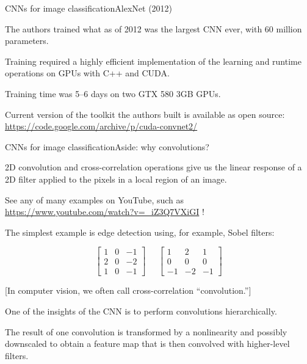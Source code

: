 \documentclass{beamer}
\begin{document}
\begin{frame}{CNNs for image classification}{AlexNet (2012)}

  The authors trained what as of 2012 was the largest CNN ever, with
  60 million parameters.

  \medskip

  Training required a highly efficient implementation of the learning
  and runtime operations on GPUs with C++ and CUDA.

  \medskip

  Training time was 5--6 days on two GTX 580 3GB GPUs.
  
  \medskip

  Current version of the toolkit the authors built is available as
  open source: \url{https://code.google.com/archive/p/cuda-convnet2/}
  
\end{frame}


\begin{frame}{CNNs for image classification}{Aside: why convolutions?}

  2D convolution and cross-correlation operations give us the linear
  response of a 2D filter applied to the pixels in a local region of
  an image.

  \medskip

  See any of many examples on YouTube, such as
  \url{https://www.youtube.com/watch?v=_iZ3Q7VXiGI} !

  \medskip

  The simplest example is edge detection using, for example, Sobel
  filters:

  $$\begin{bmatrix} 1 & 0 & -1 \\ 2 & 0 & -2 \\ 1 & 0 & -1 \end{bmatrix}
  \;\;\;\;\;
  \begin{bmatrix} 1 & 2 & 1 \\ 0 & 0 & 0 \\ -1 & -2 & -1 \end{bmatrix}$$

  \medskip

  [In computer vision, we often call cross-correlation ``convolution.'']

  \medskip

  One of the insights of the CNN is to perform convolutions
  \alert{hierarchically}.

  \medskip
  
  The result of one convolution is transformed by a nonlinearity
  and possibly downscaled to obtain a \alert{feature map} that is then
  convolved with higher-level filters.
  
\end{frame}
\end{document}
